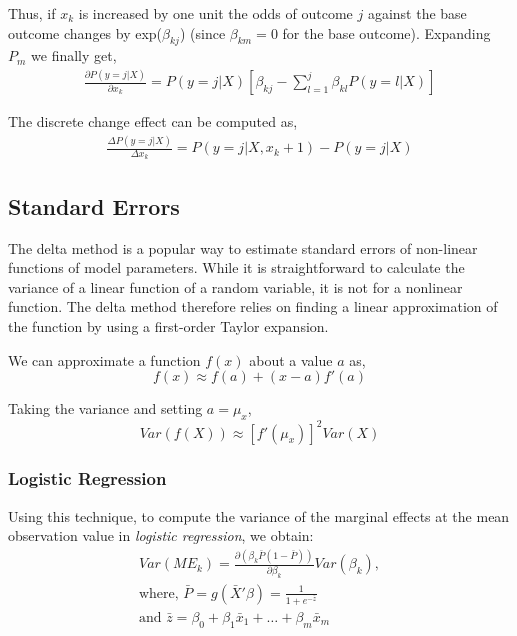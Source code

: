 Thus, if $x_k$ is increased by one unit the odds of outcome $j$ against the
base outcome changes by exp($\beta_{kj}$) (since $\beta_{km}=0$ for the base
outcome). Expanding $P_m$ we finally get,
\begin{gather*}
  \frac{\partial P(y=j|X)}{\partial x_k} = P(y=j|X)\left[ \beta_{kj} - \sum_{l=1}^{j}\beta_{kl} P(y=l|X) \right]
\end{gather*}

The discrete change effect can be computed as,
\begin{gather*}
  \frac{\Delta P(y=j|X)}{\Delta x_k} = P(y=j|X, x_k+1) - P(y=j|X)
\end{gather*}

\subsection{Standard Errors} %
\label{sub:standard_errors}
The delta method is a popular way to estimate standard errors of non-linear
functions of model parameters. While it is straightforward to calculate the
variance of a linear function of a random variable, it is not for a nonlinear
function. The delta method therefore relies on finding a linear approximation
of the function by using a first-order Taylor expansion.

We can approximate a function $f(x)$ about a value $a$ as,
\[
  f(x) \approx f(a) + (x-a)f'(a)
\]

Taking the variance and setting $a = \mu_x$,
\[
  Var(f(X)) \approx \left[f'(\mu_x)\right]^2 Var(X)
\]

\subsubsection*{Logistic Regression}
Using this technique, to compute the variance of the marginal effects at the
mean observation value in \emph{logistic regression}, we obtain:
\begin{gather*}
  Var(ME_k) = \frac{\partial (\beta_k \bar{P} (1- \bar{P}))}{\partial \beta_k} Var(\beta_k),\\
  \text{where, } \bar{P} = g(\bar{X}' \beta) = \frac{1}{1 + e^{-\bar{z}}} \\
  \text{and }    \bar{z} = \beta_0 + \beta_1 \bar{x}_1 + \dots + \beta_m \bar{x}_m
\end{gather*}


